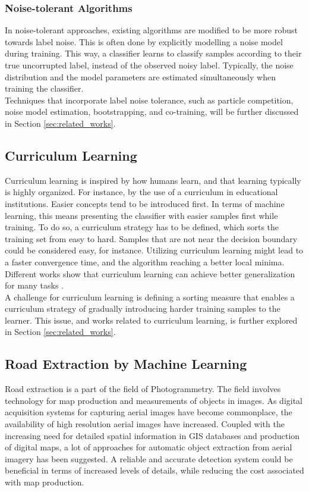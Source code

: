 \subsubsection{Noise-tolerant Algorithms}
In noise-tolerant approaches, existing algorithms are modified to be more robust towards label noise. This is often done by explicitly modelling a noise model during training. This way, a classifier learns to classify samples according to their true uncorrupted label, instead of the observed noisy label. Typically, the noise distribution and the model parameters are estimated simultaneously when training the classifier. \\

Techniques that incorporate label noise tolerance, such as particle competition, noise model estimation, bootstrapping, and co-training, will be further discussed in Section \ref{sec:related_works}.

\subsection{Curriculum Learning}
Curriculum learning is inspired by how humans learn, and that learning typically is highly organized. For instance, by the use of a curriculum in educational institutions. Easier concepts tend to be introduced first. In terms of machine learning, this means presenting the classifier with easier samples first while training. To do so, a curriculum strategy has to be defined, which sorts the training set from easy to hard. Samples that are not near the decision boundary could be considered easy, for instance. Utilizing curriculum learning might lead to a faster convergence time, and the algorithm reaching a better local minima. Different works show that curriculum learning can achieve better generalization for many tasks \citep{Bengio_curriculumlearning} \citep{Kumar_self_paced_learning} \citep{Lu_self-paced_learning_diversity}.\\

A challenge for curriculum learning is defining a sorting measure that enables a curriculum strategy of gradually introducing harder training samples to the learner. This issue, and works related to curriculum learning, is further explored in Section \ref{sec:related_works}.\\

\subsection{Road Extraction by Machine Learning}
Road extraction is a part of the field of Photogrammetry. The field involves technology for map production and measurements of objects in images. As digital acquisition systems for capturing aerial images have become commonplace, the availability of high resolution aerial images have increased. Coupled with the increasing need for detailed spatial information in \ac{GIS} databases and production of digital maps, a lot of approaches for automatic object extraction from aerial imagery has been suggested. A reliable and accurate detection system could be beneficial in terms of increased levels of details, while reducing the cost associated with map production.\\

